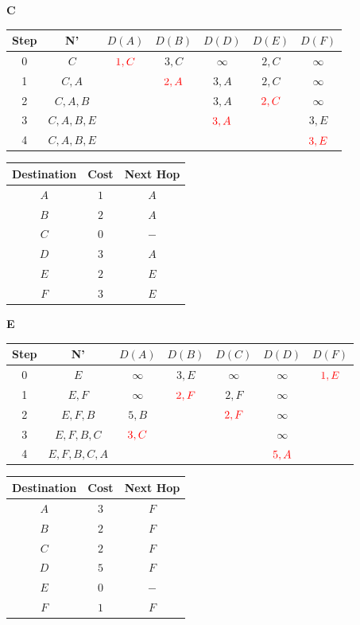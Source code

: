\documentclass[10pt]{article}
\begin{document}
	\begin{center}
	 	\textbf{C} \quad
 		\begin{tabular}{||c c c c c c c||} 
 			\hline
 			Step & N' & $D(A)$ & $D(B)$ & $D(D)$ & $D(E)$ & $D(F)$ \\[0.5ex] 
 			\hline\hline
 			0 & $C$ & $\color{red} 1,C$ & $3,C$ & $\infty$ & $2,C$ & $\infty$ \\
 			\hline
 			1 & $C,A$ & & $\color{red} 2,A$ & $3,A$ & $2,C$ & $\infty$ \\
 			\hline
 			2 & $C,A,B$ & & & $3,A$ & $\color{red} 2,C$ & $\infty$ \\
 			\hline
 			3 & $C,A,B,E$ & & & $\color{red} 3,A$ & & $3,E$ \\
 			\hline
 			4 & $C,A,B,E$ & & & & & $\color{red} 3,E$ \\
 			\hline
		\end{tabular}
		\quad
		\begin{tabular}{||c || c || c||}
			\hline
 			Destination & Cost & Next Hop\\[0.5ex] 
 			\hline\hline
			$A$ & $1$ & $A$\\
			$B$ & $2$ & $A$\\
 			$C$ & $0$ & $-$\\
			$D$ & $3$ & $A$\\
			$E$ & $2$ & $E$\\
			$F$ & $3$ & $E$\\[0.5ex]
			\hline
		\end{tabular}
	\end{center}	
	
	\begin{center}
	 	\textbf{E}
 		\begin{tabular}{||c c c c c c c||} 
 			\hline
 			Step & N' & $D(A)$ & $D(B)$ & $D(C)$ & $D(D)$ & $D(F)$ \\[0.5ex] 
 			\hline\hline
 			0 & $E$ & $\infty$ & $3,E$ & $\infty$ & $\infty$ & $\color{red} 1,E$ \\
 			\hline
 			1 & $E,F$ & $\infty$ & $\color{red} 2,F$ & $2,F$ & $\infty$ & \\
 			\hline
 			2 & $E,F,B$ & $5,B$ & & $\color{red} 2,F$ & $\infty$ & \\
 			\hline
 			3 & $E,F,B,C$ & $\color{red} 3,C$ & & & $\infty$ & \\
 			\hline
 			4 & $E,F,B,C,A$ & & & & $\color{red} 5,A$ & \\[0.5ex]  
 			\hline
		\end{tabular}
		\quad
		\begin{tabular}{||c || c || c||}
			\hline
 			Destination & Cost & Next Hop\\[0.5ex] 
 			\hline\hline
			$A$ & $3$ & $F$\\
			$B$ & $2$ & $F$\\
 			$C$ & $2$ & $F$\\
			$D$ & $5$ & $F$\\
			$E$ & $0$ & $-$\\
			$F$ & $1$ & $F$\\[0.5ex]
			\hline
		\end{tabular}
	\end{center}
	
\end{document}
